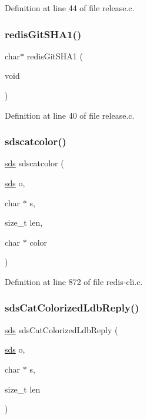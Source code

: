 Definition at line 44 of file release.\+c.

\mbox{\label{redis-cli_8c_a598b97b058f3470583dd1b6fc6498102}} 
\subsubsection{\texorpdfstring{redis\+Git\+S\+H\+A1()}{redisGitSHA1()}}
{\footnotesize\ttfamily char$\ast$ redis\+Git\+S\+H\+A1 (\begin{DoxyParamCaption}\item[{void}]{ }\end{DoxyParamCaption})}



Definition at line 40 of file release.\+c.

\mbox{\label{redis-cli_8c_a5e975ae7748971b112576394ed9446be}} 
\subsubsection{\texorpdfstring{sdscatcolor()}{sdscatcolor()}}
{\footnotesize\ttfamily \hyperlink{sds_8h_ad69abac3df4532879db9642c95f5ef6f}{sds} sdscatcolor (\begin{DoxyParamCaption}\item[{\hyperlink{sds_8h_ad69abac3df4532879db9642c95f5ef6f}{sds}}]{o,  }\item[{char $\ast$}]{s,  }\item[{size\+\_\+t}]{len,  }\item[{char $\ast$}]{color }\end{DoxyParamCaption})}



Definition at line 872 of file redis-\/cli.\+c.

\mbox{\label{redis-cli_8c_a7c60ad60c617f931dc73df54d36852c4}} 
\subsubsection{\texorpdfstring{sds\+Cat\+Colorized\+Ldb\+Reply()}{sdsCatColorizedLdbReply()}}
{\footnotesize\ttfamily \hyperlink{sds_8h_ad69abac3df4532879db9642c95f5ef6f}{sds} sds\+Cat\+Colorized\+Ldb\+Reply (\begin{DoxyParamCaption}\item[{\hyperlink{sds_8h_ad69abac3df4532879db9642c95f5ef6f}{sds}}]{o,  }\item[{char $\ast$}]{s,  }\item[{size\+\_\+t}]{len }\end{DoxyParamCaption})}



